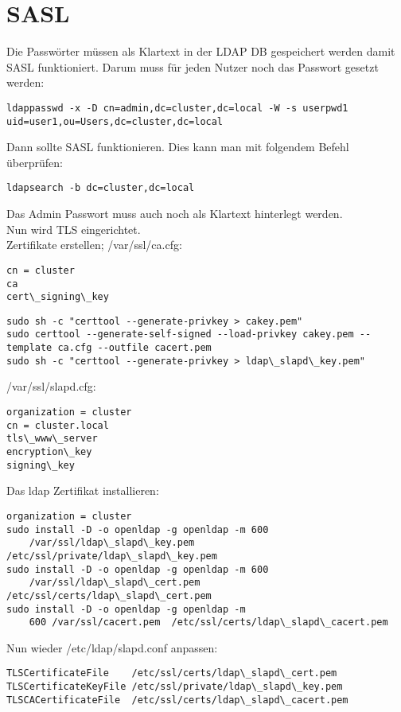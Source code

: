 \section{SASL}
Die Passwörter müssen als Klartext in der LDAP DB gespeichert werden damit SASL funktioniert. Darum muss für jeden Nutzer noch das Passwort gesetzt werden:
\begin{lstlisting}[style=Bash]
ldappasswd -x -D cn=admin,dc=cluster,dc=local -W -s userpwd1 uid=user1,ou=Users,dc=cluster,dc=local 
\end{lstlisting}
Dann sollte SASL funktionieren. Dies kann man mit folgendem Befehl überprüfen:
\begin{lstlisting}[style=Bash]
ldapsearch -b dc=cluster,dc=local
\end{lstlisting}
Das Admin Passwort muss auch noch als Klartext hinterlegt werden.\\
Nun wird TLS eingerichtet.\\
Zertifikate erstellen; /var/ssl/ca.cfg:
\begin{lstlisting}[style=Bash]
cn = cluster
ca
cert\_signing\_key
\end{lstlisting}
\begin{lstlisting}[style=Bash]
sudo sh -c "certtool --generate-privkey > cakey.pem" 
sudo certtool --generate-self-signed --load-privkey cakey.pem --template ca.cfg --outfile cacert.pem 
sudo sh -c "certtool --generate-privkey > ldap\_slapd\_key.pem"
\end{lstlisting}
/var/ssl/slapd.cfg:
\begin{lstlisting}[style=Bash]
organization = cluster
cn = cluster.local
tls\_www\_server
encryption\_key
signing\_key
\end{lstlisting}
Das ldap Zertifikat installieren:
\begin{lstlisting}[style=Bash]
organization = cluster
sudo install -D -o openldap -g openldap -m 600 
    /var/ssl/ldap\_slapd\_key.pem  /etc/ssl/private/ldap\_slapd\_key.pem
sudo install -D -o openldap -g openldap -m 600 
    /var/ssl/ldap\_slapd\_cert.pem  /etc/ssl/certs/ldap\_slapd\_cert.pem
sudo install -D -o openldap -g openldap -m 
    600 /var/ssl/cacert.pem  /etc/ssl/certs/ldap\_slapd\_cacert.pem 
\end{lstlisting}
Nun wieder /etc/ldap/slapd.conf anpassen:
\begin{lstlisting}[style=Bash]
TLSCertificateFile    /etc/ssl/certs/ldap\_slapd\_cert.pem
TLSCertificateKeyFile /etc/ssl/private/ldap\_slapd\_key.pem
TLSCACertificateFile  /etc/ssl/certs/ldap\_slapd\_cacert.pem
\end{lstlisting}
